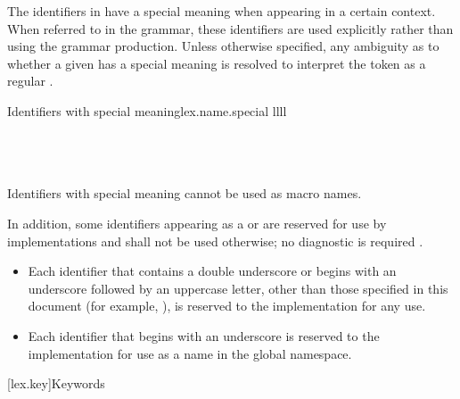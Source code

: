 \pnum
{}%
%
%
%
The identifiers in  have a special meaning when
appearing in a certain context. When referred to in the grammar, these identifiers
are used explicitly rather than using the  grammar production.
Unless otherwise specified, any ambiguity as to whether a given
 has a special meaning is resolved to interpret the
token as a regular .

\begin{multicolfloattable}{Identifiers with special meaning}{lex.name.special}
{llll}
           \\
\columnbreak
{}          \\
\columnbreak
{}          \\
\columnbreak
{}        \\
\end{multicolfloattable}

\pnum
\begin{note}
Identifiers with special meaning
cannot be used as macro names.
\end{note}

\pnum
{}%
%
%
In addition, some identifiers
appearing as a  or 
are reserved for use by \Cpp{}
implementations and shall
not be used otherwise; no diagnostic is required .
\begin{itemize}
\item
Each identifier that contains a double underscore
\tcode{\unun}
%
or begins with an underscore followed by
an uppercase letter,
other than those specified in this document
(for example, ),
%
is reserved to the implementation for any use.
\item
Each identifier that begins with an underscore is
%
reserved to the implementation for use as a name in the global namespace.%
\end{itemize}%

[lex.key]{Keywords}

